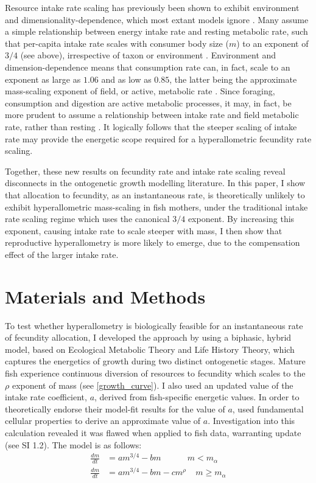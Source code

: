 \documentclass[a4paper]{article} %
\begin{document}
\begin{center}
\begin{minipage}{\linewidth}
    Resource intake rate scaling has previously been shown to exhibit environment and dimensionality-dependence, which most extant models ignore \autocite{Pawar2012}. Many assume a simple relationship between energy intake rate and resting metabolic rate, such that per-capita intake rate scales with consumer body size ($m$) to an exponent of $3/4$ (see above), irrespective of taxon or environment \autocite{Pawar2012}. Environment and dimension-dependence means that consumption rate can, in fact, scale to an exponent as large as $1.06$ and as low as $0.85$, the latter being the approximate mass-scaling exponent of field, or active, metabolic rate \autocite{peters1983,Weibel2004, Pawar2012}. Since foraging, consumption and digestion are active metabolic processes, it may, in fact, be more prudent to assume a relationship between intake rate and field metabolic rate, rather than resting \autocite{Boisclair1993}. It logically follows that the steeper scaling of intake rate may provide the energetic scope required for a hyperallometric fecundity rate scaling.

    Together, these new results on fecundity rate and intake rate scaling reveal disconnects in the ontogenetic growth modelling literature. In this paper, I show that allocation to fecundity, as an instantaneous rate, is theoretically unlikely to exhibit hyperallometric mass-scaling in fish mothers, under the traditional intake rate scaling regime which uses the canonical $3/4$ exponent. By increasing this exponent, causing intake rate to scale steeper with mass, I then show that reproductive hyperallometry is more likely to emerge, due to the compensation effect of the larger intake rate.
\section{Materials and Methods}\thispagestyle{plain}

To test whether hyperallometry is biologically feasible for an instantaneous rate of fecundity allocation, I developed the \textcite{Charnov2001} approach by using a biphasic, hybrid model, based on Ecological Metabolic Theory and Life History Theory, which captures the energetics of growth during two distinct ontogenetic stages. Mature fish experience continuous diversion of resources to fecundity which scales to the $\rho$ exponent of mass (see \cref{growth_curve}). I also used an updated value of the intake rate coefficient, $a$, derived from fish-specific energetic values. In order to theoretically endorse their model-fit results for the value of $a$, \textcite{West2001} used fundamental cellular properties to derive an approximate value of $a$. Investigation into this calculation revealed it was flawed when applied to fish data, warranting update (see SI 1.2). The model is as follows:
\begin{align}
    \frac{dm}{dt} &= am^{3/4} - bm \ \ \ \ \ \ \ \ \ \ \ \ \ \ m < m_{\alpha} \label{luke_model_juvenile}\\
    \frac{dm}{dt} &= am^{3/4} - bm - cm^{\rho} \ \ \ \ \ m \geq m_{\alpha} \label{luke_model}
\end{align}


\end{minipage}
\end{center}
\end{document}
